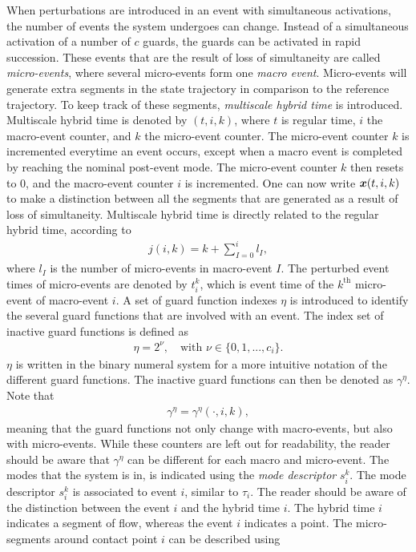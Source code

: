 \documentclass[../DC2017114Bouma.tex]{subfiles}
\begin{document}
When perturbations are introduced in an event with simultaneous activations, the number of events the system undergoes can change. Instead of a simultaneous activation of a number of $c$ guards, the guards can be activated in rapid succession. These events that are the result of loss of simultaneity are called \textit{micro-events}, where several micro-events form one \textit{macro event}. Micro-events will generate extra segments in the state trajectory in comparison to the reference trajectory. To keep track of these segments, \textit{multiscale hybrid time} is introduced. Multiscale hybrid time is denoted by $(t,i,k)$, where $t$ is regular time, $i$ the macro-event counter, and $k$ the micro-event counter. The micro-event counter $k$ is incremented everytime an event occurs, except when a macro event is completed by reaching the nominal post-event mode. The micro-event counter $k$ then resets to $0$, and the macro-event counter $i$ is incremented. One can now write ${\boldsymbol{x}}(t,i,k)$ to make a distinction between all the segments that are generated as a result of loss of simultaneity. Multiscale hybrid time is directly related to the regular hybrid time, according to
\begin{align}
j(i,k) = k + \sum_{I=0}^{i}l_I,
\end{align}
where $l_I$ is the number of micro-events in macro-event $I$. The perturbed event times of micro-events are denoted by $t^k_i$, which is event time of the $k^{\text{th}}$ micro-event of macro-event $i$. A set of guard function indexes $\eta$ is introduced to identify the several guard functions that are involved with an event. The index set of inactive guard functions is defined as
\begin{align}
\eta = 2^{\nu},\quad\text{with }\nu\in\{0,1,...,c_i\}.
\end{align}
$\eta$ is written in the binary numeral system for a more intuitive notation of the different guard functions. The inactive guard functions can then be denoted as $\gamma^\eta$. Note that
\begin{align}
\gamma^\eta = \gamma^\eta(\cdot,i,k),
\end{align}
meaning that the guard functions not only change with macro-events, but also with micro-events. While these counters are left out for readability, the reader should be aware that $\gamma^\eta$ can be different for each macro and micro-event. The modes that the system is in, is indicated using the \textit{mode descriptor} $s^k_i$. The mode descriptor $s^k_i$ is associated to event $i$, similar to $\tau_i$. The reader should be aware of the distinction between the event $i$ and the hybrid time $i$. The hybrid time $i$ indicates a segment of flow, whereas the event $i$ indicates a point. The micro-segments around contact point $i$ can be described using
\end{document}
